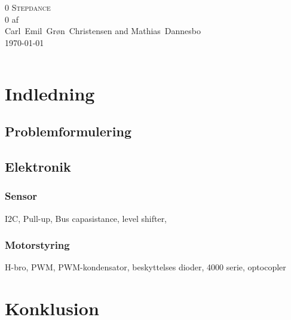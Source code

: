 \documentclass[a4paper,oneside,article,danish,table,draft]{memoir}
\newcommand{\authorvar}{Carl~Emil~Grøn~Christensen and Mathias~Dannesbo}
\newcommand{\pretitlevar}{0}
\newcommand{\titlevar}{Stepdance}
\newcommand{\subtitlevar}{0}
\newcommand{\datevar}{\today}
\begin{document}

\begin{center}
  \if\pretitlevar 0
  \else{\Large\pretitlevar\\} \fi
  \textsc{\HUGE\titlevar\\}
  \if\subtitlevar 0
  \else {\Large\subtitlevar\\} \fi
  {\LARGE 
  af\\
   \authorvar}\\
 \datevar\\
\end{center}

\vfill
\begin{abstract} %
\end{abstract}\vfill
\noindent
\begin{tabular*}{\textwidth}{@{\extracolsep{\fill}} ll}

\end{tabular*}

\thispagestyle{empty}
\clearpage
\setcounter{tocdepth}{2} \tableofcontents \clearpage


\chapter{Indledning}\label{chap:ind}
\section{Problemformulering}
\begin{itemize}
\end{itemize}

\section{Elektronik}

\subsection{Sensor}
I2C, Pull-up, Bus capasistance, level shifter,

\subsection{Motorstyring}
H-bro, PWM, PWM-kondensator, beskyttelses dioder, 4000 serie, optocopler


\chapter{Konklusion} \label{chap:kon}
\clearpage
\listoftables
\listoffigures
 
\end{document}
